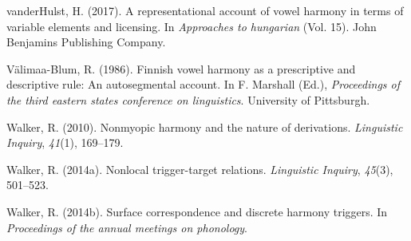 \documentclass[floatsintext,man]{apa6}
\theoremstyle{definition}
\theoremstyle{definition}
\theoremstyle{definition}
\theoremstyle{remark}
\begin{document}
\hypertarget{ref-vdHulst2017}{}
vanderHulst, H. (2017). A representational account of vowel harmony in
terms of variable elements and licensing. In \emph{Approaches to
hungarian} (Vol. 15). John Benjamins Publishing Company.

\hypertarget{ref-valimaablum1986}{}
Välimaa-Blum, R. (1986). Finnish vowel harmony as a prescriptive and
descriptive rule: An autosegmental account. In F. Marshall (Ed.),
\emph{Proceedings of the third eastern states conference on
linguistics}. University of Pittsburgh.

\hypertarget{ref-walker2010}{}
Walker, R. (2010). Nonmyopic harmony and the nature of derivations.
\emph{Linguistic Inquiry}, \emph{41}(1), 169--179.

\hypertarget{ref-walkeroroquen}{}
Walker, R. (2014a). Nonlocal trigger-target relations. \emph{Linguistic
Inquiry}, \emph{45}(3), 501--523.

\hypertarget{ref-walker2014}{}
Walker, R. (2014b). Surface correspondence and discrete harmony
triggers. In \emph{Proceedings of the annual meetings on phonology}.
\end{document}
